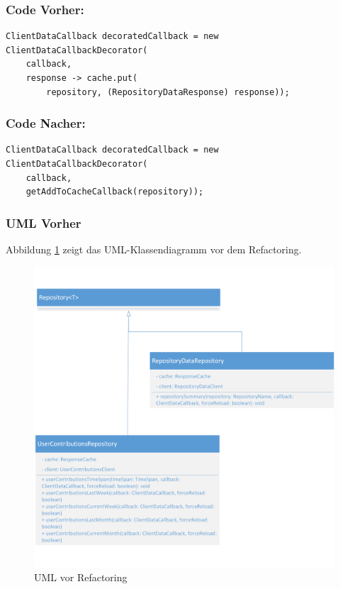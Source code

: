 \documentclass[12pt]{article}
\begin{document}
\subsubsection*{Code Vorher:}
\begin{lstlisting}[breaklines=false]
ClientDataCallback decoratedCallback = new ClientDataCallbackDecorator(
	callback, 
	response -> cache.put(
		repository, (RepositoryDataResponse) response));
\end{lstlisting}
\subsubsection*{Code Nacher:}
\begin{lstlisting}[breaklines=false]
ClientDataCallback decoratedCallback = new ClientDataCallbackDecorator(
	callback, 
	getAddToCacheCallback(repository));
\end{lstlisting}

\newpage
\subsubsection{UML Vorher}
Abbildung \ref{fig:ExtractMethod_Refactoring_Before} zeigt das UML-Klassendiagramm vor dem Refactoring.
\begin{figure}[h]
  \includegraphics{refactoring_extract_method_repository_before.png}
  \centering
  \caption{UML vor Refactoring}
  \label{fig:ExtractMethod_Refactoring_Before}
\end{figure}
\end{document}
